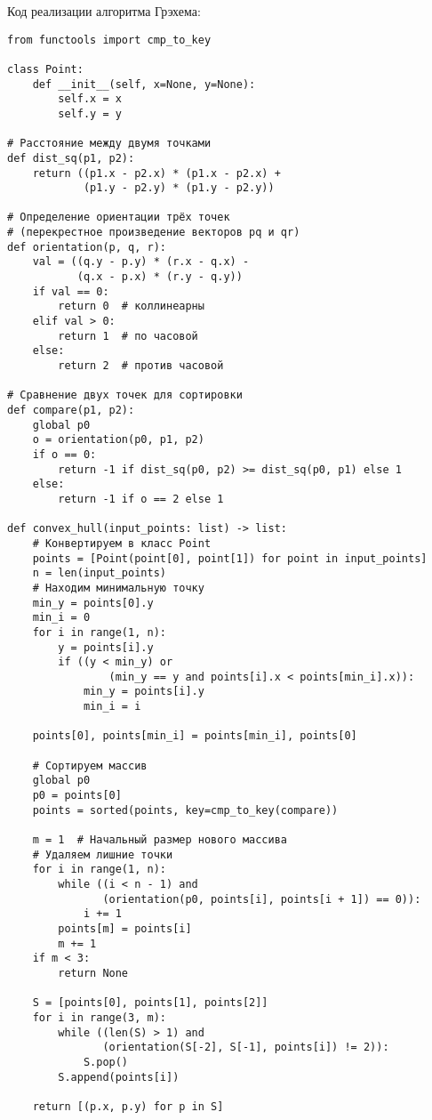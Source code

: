 \newpage

Код реализации алгоритма Грэхема:

\begin{verbatim}
from functools import cmp_to_key

class Point:
    def __init__(self, x=None, y=None):
        self.x = x
        self.y = y

# Расстояние между двумя точками
def dist_sq(p1, p2):
    return ((p1.x - p2.x) * (p1.x - p2.x) +
            (p1.y - p2.y) * (p1.y - p2.y))

# Определение ориентации трёх точек
# (перекрестное произведение векторов pq и qr)
def orientation(p, q, r):
    val = ((q.y - p.y) * (r.x - q.x) -
           (q.x - p.x) * (r.y - q.y))
    if val == 0:
        return 0  # коллинеарны
    elif val > 0:
        return 1  # по часовой
    else:
        return 2  # против часовой

# Сравнение двух точек для сортировки
def compare(p1, p2):
    global p0
    o = orientation(p0, p1, p2)
    if o == 0:
        return -1 if dist_sq(p0, p2) >= dist_sq(p0, p1) else 1
    else:
        return -1 if o == 2 else 1

def convex_hull(input_points: list) -> list:
    # Конвертируем в класс Point
    points = [Point(point[0], point[1]) for point in input_points]
    n = len(input_points)
    # Находим минимальную точку
    min_y = points[0].y
    min_i = 0
    for i in range(1, n):
        y = points[i].y
        if ((y < min_y) or
                (min_y == y and points[i].x < points[min_i].x)):
            min_y = points[i].y
            min_i = i

    points[0], points[min_i] = points[min_i], points[0]

    # Сортируем массив
    global p0
    p0 = points[0]
    points = sorted(points, key=cmp_to_key(compare))

    m = 1  # Начальный размер нового массива
    # Удаляем лишние точки
    for i in range(1, n):
        while ((i < n - 1) and
               (orientation(p0, points[i], points[i + 1]) == 0)):
            i += 1
        points[m] = points[i]
        m += 1
    if m < 3:
        return None

    S = [points[0], points[1], points[2]]
    for i in range(3, m):
        while ((len(S) > 1) and
               (orientation(S[-2], S[-1], points[i]) != 2)):
            S.pop()
        S.append(points[i])

    return [(p.x, p.y) for p in S]
\end{verbatim}

